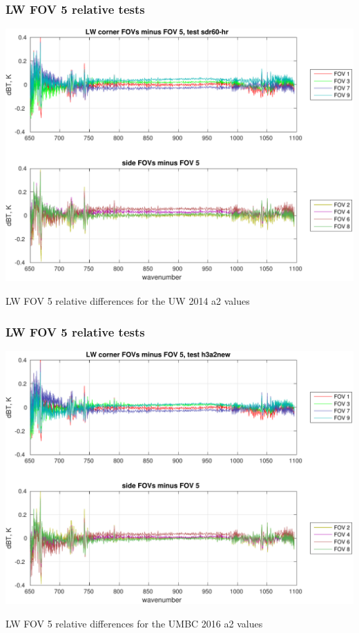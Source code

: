\documentclass[11pt]{beamer}
\begin{document}
\begin{frame}
\frametitle{LW FOV 5 relative tests}
\begin{center}
  \includegraphics[scale=0.5]{figures/LW_FOV_5_rel_sdr60.pdf}
\end{center}
\begin{center}
  LW FOV 5 relative differences for the UW 2014 a2 values
\end{center}
\end{frame}
\begin{frame}
\frametitle{LW FOV 5 relative tests}
\begin{center}
  \includegraphics[scale=0.5]{figures/LW_FOV_5_rel_a2new.pdf}
\end{center}
\begin{center}
  LW FOV 5 relative differences for the UMBC 2016 a2 values
\end{center}
\end{frame}
\end{document}
